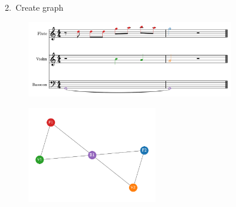 \documentclass[handout]{beamer}
\begin{document}
\begin{frame}{2.\ Create graph}
    \begin{figure}
        \includegraphics[width=0.8\textwidth]{../Figures/toy-1.png}
    \end{figure}
    \pause
    \begin{figure}
        \includegraphics[width=0.5\textwidth]{../Figures/toy_graph.pdf}
    \end{figure}

\end{frame}
\end{document}
